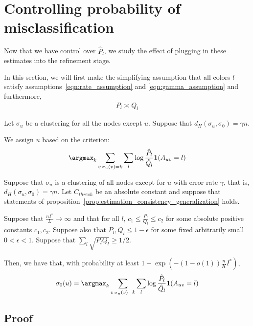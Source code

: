 \documentclass{article}
\begin{document}
\newpage
\section{Controlling probability of misclassification}
\label{sec:misclassify}

Now that we have control over $\hat{P}_l$, we study the effect of plugging in these estimates into the refinement stage.

\begin{shaded}
In this section, we will first make the simplifying assumption that all colors $l$ satisfy assumptions~\ref{eqn:rate_assumption} and \ref{eqn:gamma_assumption} and furthermore, 
\begin{align}
P_l \asymp Q_l \label{eqn:Pl_Ql_equiv}
\end{align}
\end{shaded}



Let $\sigma_u$ be a clustering for all the nodes except $u$. Suppose that $d_H(\sigma_u, \sigma_0) = \gamma n$. 


We assign $u$ based on the criterion:
\[
\argmax_k \sum_{v\, \sigma_u(v)=k} \sum_l \log \frac{\hat{P}_l}{\hat{Q}_l} \mathbf{1}(A_{uv} = l) 
\]

\begin{shaded}
\begin{proposition}
Suppose that $\sigma_u$ is a clustering of all nodes except for $u$ with error rate $\gamma$, that is, $d_H(\sigma_u, \sigma_0) = \gamma n$. Let $C_{thresh}$ be an absolute constant and suppose that statements of proposition~\ref{prop:estimation_consistency_generalization} holds. 

Suppose that $\frac{n I^*}{L} \rightarrow \infty$ and that for all $l$, $c_1 \leq \frac{P_l}{Q_l} \leq c_2$ for some absolute positive constants $c_1, c_2$. Suppose also that $P_l, Q_l \leq 1 - \epsilon$ for some fixed arbitrarily small $0 < \epsilon < 1$. Suppose that $\sum_l \sqrt{P_l Q_l} \geq 1/2$. 

Then, we have that, with probability at least $1 - \exp \left( - (1 - o(1)) \frac{n}{K} I^* \right)$, 
\[
\sigma_0(u) = \argmax_k \sum_{v\, \sigma_u(v)=k} \sum_l \log \frac{\hat{P}_l}{\hat{Q}_l} \mathbf{1}(A_{uv} = l) 
\]

\end{proposition}
\end{shaded}



\subsection{Proof}
\end{document}
